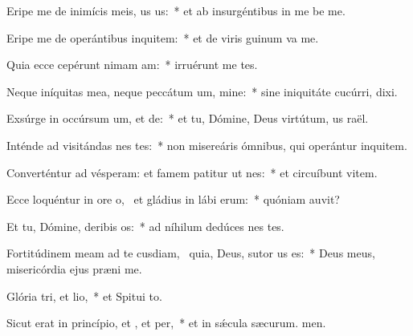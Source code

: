 \item Eripe me de inimícis meis, us us:~* et ab insurgéntibus in me be me.
\item Eripe me de operántibus inquitem:~* et de viris guinum va me.
\item Quia ecce cepérunt nimam am:~* irruérunt  me tes.
\item Neque iníquitas mea, neque peccátum um, mine:~* sine iniquitáte cucúrri,  dixi.
\item Exsúrge in occúrsum um, et de:~* et tu, Dómine, Deus virtútum, us raël.
\item Inténde ad visitándas nes tes:~* non misereáris ómnibus, qui operántur inquitem.
\item Converténtur ad vésperam: et famem patitur ut nes:~* et circuíbunt vitem.
\item Ecce loquéntur in ore o,~\pscross{} et gládius in lábi erum:~* quóniam  auvit?
\item Et tu, Dómine, deribis os:~* ad níhilum dedúces nes tes.
\item Fortitúdinem meam ad te cusdiam,~\pscross{} quia, Deus, sutor us es:~* Deus meus, misericórdia ejus præni me.
\item Glória tri, et lio,~* et Spitui to.
\item Sicut erat in princípio, et , et per,~* et in sǽcula sæcurum. men.
